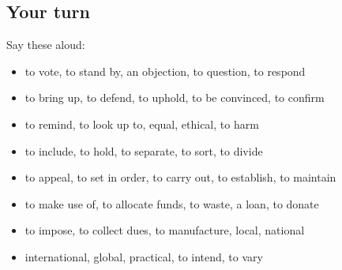 \subsection*{Your turn}
Say these aloud:

\begin{itemize}
\raggedright
  \item to vote, to stand by, an objection, to question, to respond
  \item to bring up, to defend, to uphold, to be convinced, to confirm
  \item to remind, to look up to, equal, ethical, to harm
  \item to include, to hold, to separate, to sort, to divide
  \item to appeal, to set in order, to carry out, to establish, to maintain
  \item to make use of, to allocate funds, to waste, a loan, to donate
  \item to impose, to collect dues, to manufacture, local, national
  \item international, global, practical, to intend, to vary
\end{itemize}

